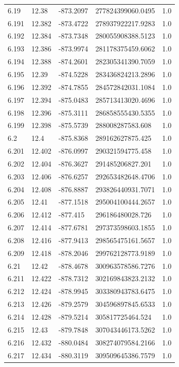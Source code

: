 \begin{tabular}{lllll}
6.19 & 12.38 & -873.2097 & 277824399060.0495 & 1.0 \\
6.191 & 12.382 & -873.4722 & 278937922217.9283 & 1.0 \\
6.192 & 12.384 & -873.7348 & 280055908388.5123 & 1.0 \\
6.193 & 12.386 & -873.9974 & 281178375459.6062 & 1.0 \\
6.194 & 12.388 & -874.2601 & 282305341390.7059 & 1.0 \\
6.195 & 12.39 & -874.5228 & 283436824213.2896 & 1.0 \\
6.196 & 12.392 & -874.7855 & 284572842031.1084 & 1.0 \\
6.197 & 12.394 & -875.0483 & 285713413020.4696 & 1.0 \\
6.198 & 12.396 & -875.3111 & 286858555430.5355 & 1.0 \\
6.199 & 12.398 & -875.5739 & 288008287583.608 & 1.0 \\
6.2 & 12.4 & -875.8368 & 289162627875.425 & 1.0 \\
6.201 & 12.402 & -876.0997 & 290321594775.458 & 1.0 \\
6.202 & 12.404 & -876.3627 & 291485206827.201 & 1.0 \\
6.203 & 12.406 & -876.6257 & 292653482648.4706 & 1.0 \\
6.204 & 12.408 & -876.8887 & 293826440931.7071 & 1.0 \\
6.205 & 12.41 & -877.1518 & 295004100444.2657 & 1.0 \\
6.206 & 12.412 & -877.415 & 296186480028.726 & 1.0 \\
6.207 & 12.414 & -877.6781 & 297373598603.1855 & 1.0 \\
6.208 & 12.416 & -877.9413 & 298565475161.5657 & 1.0 \\
6.209 & 12.418 & -878.2046 & 299762128773.9189 & 1.0 \\
6.21 & 12.42 & -878.4678 & 300963578586.7276 & 1.0 \\
6.211 & 12.422 & -878.7312 & 302169843823.2132 & 1.0 \\
6.212 & 12.424 & -878.9945 & 303380943783.6475 & 1.0 \\
6.213 & 12.426 & -879.2579 & 304596897845.6533 & 1.0 \\
6.214 & 12.428 & -879.5214 & 305817725464.524 & 1.0 \\
6.215 & 12.43 & -879.7848 & 307043446173.5262 & 1.0 \\
6.216 & 12.432 & -880.0484 & 308274079584.2166 & 1.0 \\
6.217 & 12.434 & -880.3119 & 309509645386.7579 & 1.0 \\

\end{tabular}
